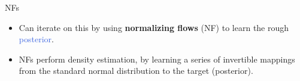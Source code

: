 \documentclass[aspectratio=169, 11pt]{beamer}
\begin{document}
\begin{frame}{NFs}
    \begin{itemize}\vspace{3em}

    \item<1-> Can iterate on this by using \textbf{normalizing flows} (NF) to learn the rough \textcolor{RoyalBlue}{posterior}.
    \item<2-> NFs perform density estimation, by learning a series of invertible mappings from the standard normal distribution to the target (posterior). 
\end{itemize}\vspace{0em}
\end{frame}
\end{document}
